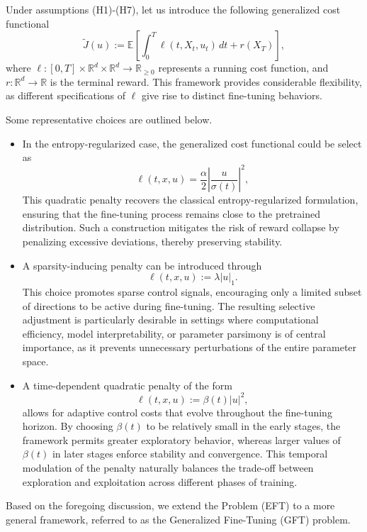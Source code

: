 \documentclass[11pt]{article}
\begin{document}
Under assumptions (H1)-(H7), let us introduce the following generalized cost functional
\begin{equation}
    \widetilde{J}(u) := \mathbb{E}\left[ \int_0^T \ell(t, X_t, u_t)\, dt + r(X_T) \right],
\end{equation}
where $\ell : [0,T] \times \mathbb{R}^d \times \mathbb{R}^d \to \mathbb{R}_{\ge 0}$ represents a running cost function, and $r : \mathbb{R}^d \to \mathbb{R}$ is the terminal reward. This framework provides considerable flexibility, as different specifications of $\ell$ give rise to distinct fine-tuning behaviors. 


Some representative choices are outlined below.
\begin{itemize}
\item In the entropy-regularized case, the generalized cost functional could be select as 
$$\ell(t,x,u) = \frac{\alpha}{2} \left|\frac{u}{\sigma(t)}\right|^2,$$ 
This quadratic penalty recovers the classical entropy-regularized formulation, ensuring that the fine-tuning process remains close to the pretrained distribution. Such a construction mitigates the risk of reward collapse by penalizing excessive deviations, thereby preserving stability.
\item A sparsity-inducing penalty can be introduced through
$$\ell(t,x,u) :=\lambda|u|_1.$$
This choice promotes sparse control signals, encouraging only a limited subset of directions to be active during fine-tuning. The resulting selective adjustment is particularly desirable in settings where computational efficiency, model interpretability, or parameter parsimony is of central importance, as it prevents unnecessary perturbations of the entire parameter space.

\item  A time-dependent quadratic penalty of the form
$$\ell(t,x,u) := \beta(t) |u|^2,$$ 
allows for adaptive control costs that evolve throughout the fine-tuning horizon. By choosing $\beta(t)$ to be relatively small in the early stages, the framework permits greater exploratory behavior, whereas larger values of $\beta(t)$ in later stages enforce stability and convergence. This temporal modulation of the penalty naturally balances the trade-off between exploration and exploitation across different phases of training.
\end{itemize}

Based on the foregoing discussion, we extend the Problem (EFT) to a more general framework, referred to as the Generalized Fine-Tuning (GFT) problem. \\
\end{document}
